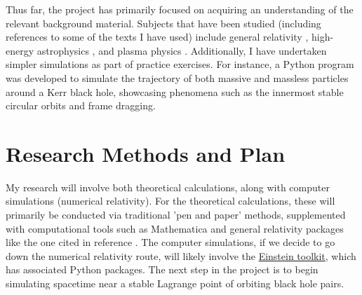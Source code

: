 Thus far, the project has primarily focused on acquiring an understanding of the relevant background material. Subjects that have been studied (including references to some of the texts I have used) include general relativity \cite{hartle2003gravity,carroll2019spacetime}, high-energy astrophysics \cite{longair2010high}, and plasma physics \cite{choudhuri_1998}. Additionally, I have undertaken simpler simulations as part of practice exercises. For instance, a Python program was developed to simulate the trajectory of both massive and massless particles around a Kerr black hole, showcasing phenomena such as the innermost stable circular orbits and frame dragging.


\section{Research Methods and Plan}


My research will involve both theoretical calculations, along with computer simulations (numerical relativity). For the theoretical calculations, these will primarily be conducted via traditional 'pen and paper' methods, supplemented with computational tools such as Mathematica and general relativity packages like the one cited in reference  \cite{Shoshany2021_OGRe}. The computer simulations, if we decide to go down the numerical relativity route, will likely involve the \href{http://einsteintoolkit.org/about.html}{Einstein toolkit}, which has associated Python packages. The next step in the project is to begin simulating spacetime near a stable Lagrange point of orbiting black hole pairs.






